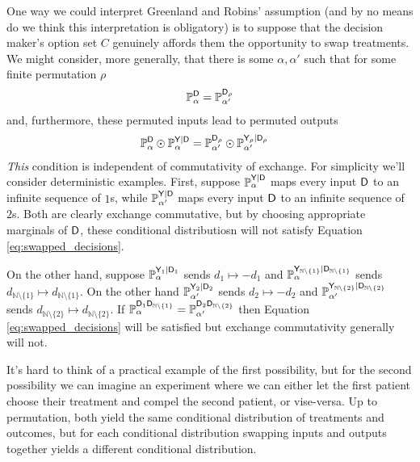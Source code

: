 One way we could interpret Greenland and Robins' assumption (and by no means do we think this interpretation is obligatory) is to suppose that the decision maker's option set $C$ genuinely affords them the opportunity to swap treatments. We might consider, more generally, that there is some $\alpha,\alpha'$ such that for some finite permutation $\rho$
\begin{align}
    \mathbb{P}_\alpha^{\mathsf{D}} = \mathbb{P}_{\alpha'}^{\mathsf{D}_\rho}
\end{align}
and, furthermore, these permuted inputs lead to permuted outputs
\begin{align}
    \mathbb{P}_\alpha^{\mathsf{D}}\odot \mathbb{P}_\alpha^{\mathsf{Y}|\mathsf{D}} &= \mathbb{P}_{\alpha'}^{\mathsf{D}_\rho}\odot \mathbb{P}_{\alpha'}^{\mathsf{Y}_\rho|\mathsf{D}_\rho}\label{eq:swapped_decisions}
\end{align}
\emph{This} condition is independent of commutativity of exchange. For simplicity we'll consider deterministic examples. First, suppose $\mathbb{P}_\alpha^{\mathsf{Y}|\mathsf{D}}$ maps every input $\mathsf{D}$ to an infinite sequence of $1$s, while $\mathbb{P}_{\alpha'}^{\mathsf{Y}|\mathsf{D}}$ maps every input $\mathsf{D}$ to an infinite sequence of $2$s. Both are clearly exchange commutative, but by choosing appropriate marginals of $\mathsf{D}$, these conditional distributiosn will not satisfy Equation \eqref{eq:swapped_decisions}.

On the other hand, suppose $\mathbb{P}_\alpha^{\mathsf{Y}_1|\mathsf{D}_1}$ sends $d_1\mapsto - d_1$ and $\mathbb{P}_\alpha^{\mathsf{Y}_{\mathbb{N}\setminus\{1\}}|\mathsf{D}_{\mathbb{N}\setminus\{1\}}}$ sends $d_{\mathbb{N}\setminus\{1\}} \mapsto d_{\mathbb{N}\setminus\{1\}}$. On the other hand $\mathbb{P}_{\alpha'}^{\mathsf{Y}_2|\mathsf{D}_2}$ sends $d_2\mapsto -d_2$ and $\mathbb{P}_{\alpha'}^{\mathsf{Y}_{\mathbb{N}\setminus\{2\}}|\mathsf{D}_{\mathbb{N}\setminus\{2\}}}$ sends $d_{\mathbb{N}\setminus\{2\}} \mapsto d_{\mathbb{N}\setminus\{2\}}$. If $\mathbb{P}_\alpha^{\mathsf{D}_1\mathsf{D}_{\mathbb{N}\setminus\{1\}}}=\mathbb{P}_{\alpha'}^{\mathsf{D}_2\mathsf{D}_{\mathbb{N}\setminus\{2\}}}$ then Equation \eqref{eq:swapped_decisions} will be satisfied but exchange commutativity generally will not.

It's hard to think of a practical example of the first possibility, but for the second possibility we can imagine an experiment where we can either let the first patient choose their treatment and compel the second patient, or vise-versa. Up to permutation, both yield the same conditional distribution of treatments and outcomes, but for each conditional distribution swapping inputs and outputs together yields a different conditional distribution.

